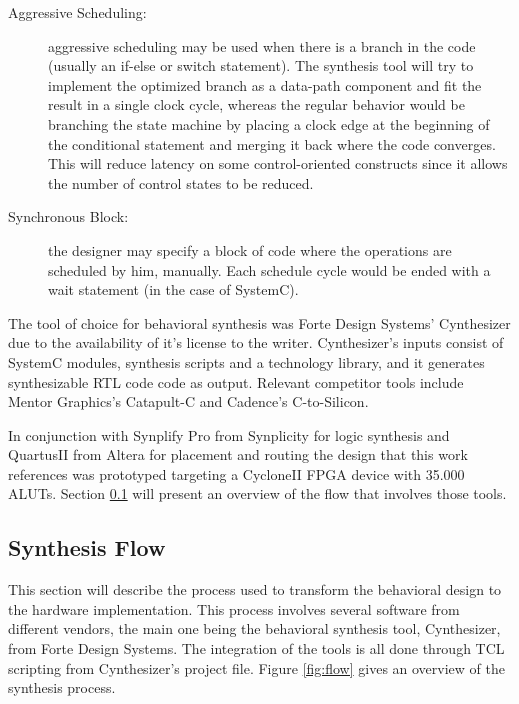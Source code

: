 \documentclass[a4paper, 12pt]{article}
\begin{document}
\begin{description}
\item[Aggressive Scheduling:] aggressive scheduling may be used when there is a branch in the code (usually an if-else or switch statement). The synthesis tool will try to implement the optimized branch as a data-path component and fit the result in a single clock cycle, whereas the regular behavior would be branching the state machine by placing a clock edge at the beginning of the conditional statement and merging it back where the code converges. This will reduce latency on some control-oriented constructs since it allows the number of control states to be reduced. 
\item[Synchronous Block:] the designer may specify a block of code where the operations are scheduled by him, manually. Each schedule cycle would be ended with a wait statement (in the case of SystemC).
\end{description}

	The tool of choice for behavioral synthesis was Forte Design Systems' Cynthesizer \cite{forteman} due to the availability of it's license to the writer. Cynthesizer's inputs consist of SystemC modules, synthesis scripts and a technology library, and it generates synthesizable RTL code code as output. Relevant competitor tools include Mentor Graphics's Catapult-C and Cadence's C-to-Silicon.

	In conjunction with Synplify Pro from Synplicity for logic synthesis and QuartusII from Altera for placement and routing the design that this work references was prototyped targeting a CycloneII FPGA device with 35.000 ALUTs. Section \ref{sec:tools} will present an overview of the flow that involves those tools.

\subsection{Synthesis Flow}
\label{sec:tools}

	This section will describe the process used to transform the behavioral design to the hardware implementation. This process involves several software from different vendors, the main one being the behavioral synthesis tool, Cynthesizer, from Forte Design Systems. The integration of the tools is all done through TCL scripting from Cynthesizer's project file. Figure \ref{fig:flow} gives an overview of the synthesis process.
\end{document}
